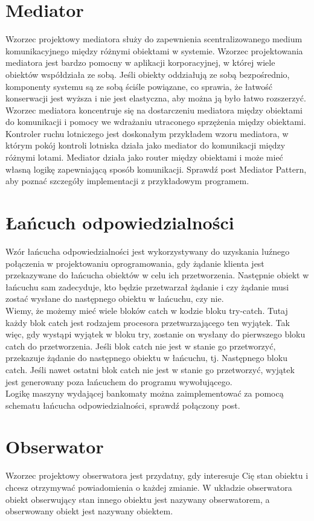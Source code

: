 \documentclass[12pt,a4paper]{article}
\begin{document}
	\section{Mediator}
	Wzorzec projektowy mediatora służy do zapewnienia scentralizowanego medium komunikacyjnego między różnymi obiektami w systemie. Wzorzec projektowania mediatora jest bardzo pomocny w aplikacji korporacyjnej, w której wiele obiektów współdziała ze sobą. Jeśli obiekty oddziałują ze sobą bezpośrednio, komponenty systemu są ze sobą ściśle powiązane, co sprawia, że łatwość konserwacji jest wyższa i nie jest elastyczna, aby można ją było łatwo rozszerzyć. Wzorzec mediatora koncentruje się na dostarczeniu mediatora między obiektami do komunikacji i pomocy we wdrażaniu utraconego sprzężenia między obiektami.\\
	Kontroler ruchu lotniczego jest doskonałym przykładem wzoru mediatora, w którym pokój kontroli lotniska działa jako mediator do komunikacji między różnymi lotami. Mediator działa jako router między obiektami i może mieć własną logikę zapewniającą sposób komunikacji. Sprawdź post Mediator Pattern, aby poznać szczegóły implementacji z przykładowym programem\cite{PankajKumar}.
	\section{Łańcuch odpowiedzialności}
	Wzór łańcucha odpowiedzialności jest wykorzystywany do uzyskania luźnego połączenia w projektowaniu oprogramowania, gdy żądanie klienta jest przekazywane do łańcucha obiektów w celu ich przetworzenia. Następnie obiekt w łańcuchu sam zadecyduje, kto będzie przetwarzał żądanie i czy żądanie musi zostać wysłane do następnego obiektu w łańcuchu, czy nie.\\
	Wiemy, że możemy mieć wiele bloków catch w kodzie bloku try-catch. Tutaj każdy blok catch jest rodzajem procesora przetwarzającego ten wyjątek. Tak więc, gdy wystąpi wyjątek w bloku try, zostanie on wysłany do pierwszego bloku catch do przetworzenia. Jeśli blok catch nie jest w stanie go przetworzyć, przekazuje żądanie do następnego obiektu w łańcuchu, tj. Następnego bloku catch. Jeśli nawet ostatni blok catch nie jest w stanie go przetworzyć, wyjątek jest generowany poza łańcuchem do programu wywołującego.\\
	
	Logikę maszyny wydającej bankomaty można zaimplementować za pomocą schematu łańcucha odpowiedzialności, sprawdź połączony post\cite{PankajKumar}.
	\section{Obserwator}
	Wzorzec projektowy obserwatora jest przydatny, gdy interesuje Cię stan obiektu i chcesz otrzymywać powiadomienia o każdej zmianie. W układzie obserwatora obiekt obserwujący stan innego obiektu jest nazywany obserwatorem, a obserwowany obiekt jest nazywany obiektem.\\
	
\end{document}
